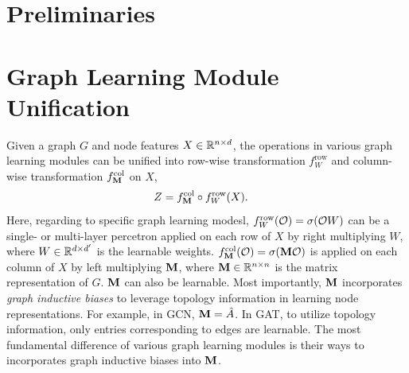 \documentclass{article} %
\begin{document}
	\section{Preliminaries}
	
	\section{Graph Learning Module Unification}
	
	Given a graph $G$ and node features $X\in{\mathbb{R}}^{n\times d}$, the operations in various graph learning modules can be unified into row-wise transformation $f_W^{\mathrm{row}}$ and column-wise transformation $f_{{\mathbf{M}}}^{\mathrm{col}}$ on $X$,
	\begin{equation}
		\label{equ:uni_grl}
		\begin{aligned}
			Z&=f_{{\mathbf{M}}}^{\mathrm{col}}\circ f_W^{\mathrm{row}}(X).
		\end{aligned}
	\end{equation}
	Here, regarding to specific graph learning modesl, $f_W^{\mathrm{row}}({\mathcal{O}})=\sigma({\mathcal{O}} W)$ can be a single- or multi-layer percetron applied on each row of $X$ by right multiplying $W$, where $W\in{\mathbb{R}}^{d\times d^{\prime}}$ is the learnable weights.
	$f_{{\mathbf{M}}}^{\mathrm{col}}({\mathcal{O}})=\sigma({\mathbf{M}}{\mathcal{O}})$ is applied on each column of $X$ by left multiplying ${\mathbf{M}}$, where ${\mathbf{M}}\in{\mathbb{R}}^{n\times n}$ is the matrix representation of $G$.
	${\mathbf{M}}$ can also be learnable.
	Most importantly, ${\mathbf{M}}$ incorporates \emph{graph inductive biases} to leverage topology information in learning node representations.
	For example, in GCN, ${\mathbf{M}}=\hat A$.
	In GAT, to utilize topology information, only entries corresponding to edges are learnable.
	The most fundamental difference of various graph learning modules is their ways to incorporates graph inductive biases into ${\mathbf{M}}$.
\end{document}
